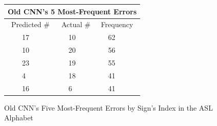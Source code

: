 \documentclass[11pt]{article}
\begin{document}
\begin{figure}[H]
\begin{center}
\begin{tabular}{ |p{2.2cm}||p{1.8cm}|p{1.8cm}| }
 \hline
 \multicolumn{3}{|c|}{Old CNN's 5 Most-Frequent Errors} \\
 \hline
 \ Predicted \# & Actual \# & Frequency\\
 \hline
 \ \ \ \ 17 & \ \ 10 & \ \ 62\\
 \ \ \ \ 10 &  \ \ 20 & \ \ 56\\
  \ \ \ \ 23 & \ \ 19 & \ \ 55\\
 \ \ \ \ 4 & \ \ 18 & \ \ 41\\
 \ \ \ \ 16 & \ \ 6 & \ \ 41\\

 \hline
\end{tabular}
\caption{Old CNN's Five Most-Frequent Errors by Sign's Index in the ASL Alphabet}
\end{center}
\end{figure}
\end{document}
